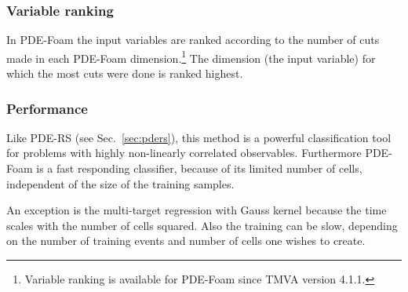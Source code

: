 \subsubsection{Variable ranking}
In PDE-Foam the input variables are ranked according to the number of
cuts made in each PDE-Foam dimension.\footnote{Variable ranking is
  available for PDE-Foam since TMVA version 4.1.1.}  The dimension
(the input variable) for which the most cuts were done is ranked
highest.

\subsubsection{Performance}

Like PDE-RS (see Sec.~\ref{sec:pders}), this method is a powerful
classification tool for problems with highly non-linearly correlated
observables.  Furthermore PDE-Foam is a fast responding classifier,
because of its limited number of cells, independent of the size of the
training samples.

An exception is the multi-target regression with Gauss kernel because
the time scales with the number of cells squared.  Also the training
can be slow, depending on the number of training events and number of
cells one wishes to create.
